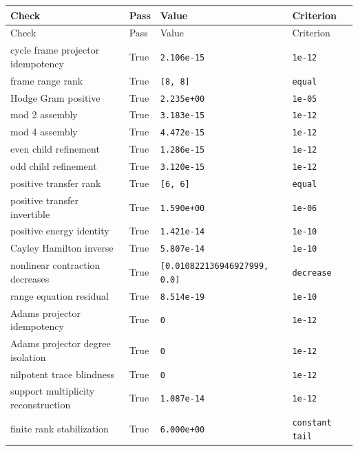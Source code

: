 \begingroup\scriptsize
\begin{longtable}{p{}p{}p{}p{}}
\toprule Check & Pass & Value & Criterion \\
\midrule\endfirsthead
\toprule Check & Pass & Value & Criterion \\
\midrule\endhead
cycle frame projector idempotency & True & \texttt{2.106e-15} & \texttt{1e-12} \\
frame range rank & True & \texttt{[8, 8]} & \texttt{equal} \\
Hodge Gram positive & True & \texttt{2.235e+00} & \texttt{1e-05} \\
mod 2 assembly & True & \texttt{3.183e-15} & \texttt{1e-12} \\
mod 4 assembly & True & \texttt{4.472e-15} & \texttt{1e-12} \\
even child refinement & True & \texttt{1.286e-15} & \texttt{1e-12} \\
odd child refinement & True & \texttt{3.120e-15} & \texttt{1e-12} \\
positive transfer rank & True & \texttt{[6, 6]} & \texttt{equal} \\
positive transfer invertible & True & \texttt{1.590e+00} & \texttt{1e-06} \\
positive energy identity & True & \texttt{1.421e-14} & \texttt{1e-10} \\
Cayley Hamilton inverse & True & \texttt{5.807e-14} & \texttt{1e-10} \\
nonlinear contraction decreases & True & \texttt{[0.010822136946927999, 0.0]} & \texttt{decrease} \\
range equation residual & True & \texttt{8.514e-19} & \texttt{1e-10} \\
Adams projector idempotency & True & \texttt{0} & \texttt{1e-12} \\
Adams projector degree isolation & True & \texttt{0} & \texttt{1e-12} \\
nilpotent trace blindness & True & \texttt{0} & \texttt{1e-12} \\
support multiplicity reconstruction & True & \texttt{1.087e-14} & \texttt{1e-12} \\
finite rank stabilization & True & \texttt{6.000e+00} & \texttt{constant tail} \\
\bottomrule
\end{longtable}
\endgroup
